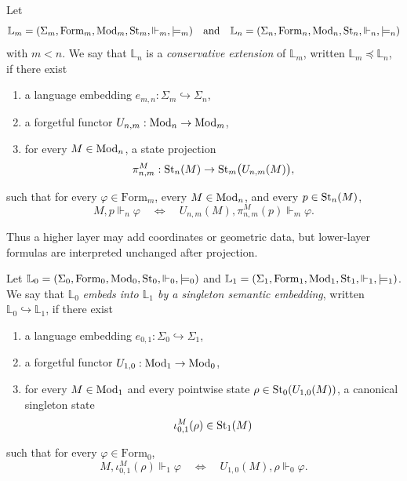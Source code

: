 \begin{definition}\label{def:conservative-extension}
Let
\[
\mathbb{L}_m=(\Sigma_m,\mathrm{Form}_m,\mathrm{Mod}_m,\mathrm{St}_m,\Vdash_m,\models_m)
\quad\text{and}\quad
\mathbb{L}_n=(\Sigma_n,\mathrm{Form}_n,\mathrm{Mod}_n,\mathrm{St}_n,\Vdash_n,\models_n)
\]
with $m<n$. We say that $\mathbb{L}_n$ is a \emph{conservative extension} of $\mathbb{L}_m$, written $\mathbb{L}_m\preceq\mathbb{L}_n$, if there exist
\begin{enumerate}[label=(\roman*),nosep]
\item a language embedding $e_{m,n}:\Sigma_m\hookrightarrow\Sigma_n$,
\item a forgetful functor $U_{n,m}:\mathrm{Mod}_n\to\mathrm{Mod}_m$,
\item for every $M\in\mathrm{Mod}_n$, a state projection
\[
\pi^M_{n,m}:\mathrm{St}_n(M)\to \mathrm{St}_m\bigl(U_{n,m}(M)\bigr),
\]
\end{enumerate}
such that for every $\varphi\in \mathrm{Form}_m$, every $M\in\mathrm{Mod}_n$, and every $p\in\mathrm{St}_n(M)$,
\begin{equation}\label{eq:conservative-extension}
M,p\Vdash_n \varphi
\quad\Longleftrightarrow\quad
U_{n,m}(M),\pi^M_{n,m}(p)\Vdash_m \varphi.
\end{equation}
\end{definition}

Thus a higher layer may add coordinates or geometric data, but lower-layer formulas are interpreted unchanged after projection.

\begin{definition}\label{def:singleton-semantic-embedding}
Let $\mathbb{L}_0=(\Sigma_0,\mathrm{Form}_0,\mathrm{Mod}_0,\mathrm{St}_0,\Vdash_0,\models_0)$ and $\mathbb{L}_1=(\Sigma_1,\mathrm{Form}_1,\mathrm{Mod}_1,\mathrm{St}_1,\Vdash_1,\models_1)$. We say that $\mathbb{L}_0$ \emph{embeds into $\mathbb{L}_1$ by a singleton semantic embedding}, written $\mathbb{L}_0\hookrightarrow\mathbb{L}_1$, if there exist
\begin{enumerate}[label=(\roman*),nosep]
\item a language embedding $e_{0,1}:\Sigma_0\hookrightarrow\Sigma_1$,
\item a forgetful functor $U_{1,0}:\mathrm{Mod}_1\to\mathrm{Mod}_0$,
\item for every $M\in\mathrm{Mod}_1$ and every pointwise state $\rho\in\mathrm{St}_0(U_{1,0}(M))$, a canonical singleton state
\[
\iota_{0,1}^M(\rho)\in\mathrm{St}_1(M)
\]
\end{enumerate}
such that for every $\varphi\in\mathrm{Form}_0$,
\begin{equation}\label{eq:singleton-semantic-embedding}
M,\iota_{0,1}^M(\rho)\Vdash_1\varphi
\quad\Longleftrightarrow\quad
U_{1,0}(M),\rho\Vdash_0\varphi.
\end{equation}
\end{definition}

